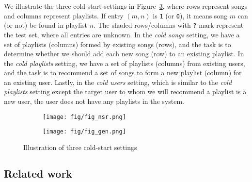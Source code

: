 We illustrate the three cold-start settings in Figure~\ref{fig:settings},
where rows represent songs and columns represent playlists.
If entry $(m, n)$ is \texttt{1} (or \texttt{0}), it means song $m$ can (or not) be found in playlist $n$.
The shaded rows/columns with \texttt{?} mark represent the test set, where all entries are unknown.
In the \emph{cold songs} setting, we have a set of playlists (columns) formed by existing songs (rows),
and the task is to determine whether we should add each new song (row) to an existing playlist.
In the \emph{cold playlists} setting, we have a set of playlists (columns) from existing users,
and the task is to recommend a set of songs to form a new playlist (column) for an existing user.
Lastly, in the \emph{cold users} setting, which is similar to the {\it cold playlists} setting except
the target user to whom we will recommend a playlist is a new user, \ie the user
does not have any playlists in the system.

\begin{figure}[t]
\begin{subfigure}{.5\columnwidth}
  \centering
  \texttt{[image: fig/fig\_nsr.png]}
  \label{fig:nsr}
\end{subfigure}%
\begin{subfigure}{.5\columnwidth}
  \centering
  \texttt{[image: fig/fig\_gen.png]}
  \label{fig:gen}
\end{subfigure}
\caption{Illustration of three cold-start settings}
\label{fig:settings}
\end{figure}



\subsection{Related work}

